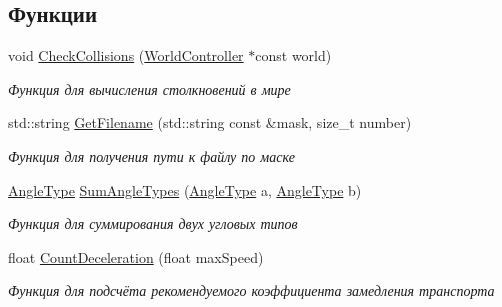 \subsection*{Функции}
\begin{DoxyCompactItemize}
\item 
void \hyperlink{namespacertm_a1fe2c356e3297343804842a57ce23a4b}{Check\+Collisions} (\hyperlink{classrtm_1_1_world_controller}{World\+Controller} $\ast$const world)
\begin{DoxyCompactList}\small\item\em Функция для вычисления столкновений в мире \end{DoxyCompactList}\item 
std\+::string \hyperlink{namespacertm_a67bf20fe33d85bc05547ff1849aeb29e}{Get\+Filename} (std\+::string const \&mask, size\+\_\+t number)
\begin{DoxyCompactList}\small\item\em Функция для получения пути к файлу по маске \end{DoxyCompactList}\item 
\hyperlink{namespacertm_a69dc82b16a0148c10962caa83d930f89}{Angle\+Type} \hyperlink{namespacertm_ac1ea2821fc44943e5c35d92e0c9cd5de}{Sum\+Angle\+Types} (\hyperlink{namespacertm_a69dc82b16a0148c10962caa83d930f89}{Angle\+Type} a, \hyperlink{namespacertm_a69dc82b16a0148c10962caa83d930f89}{Angle\+Type} b)
\begin{DoxyCompactList}\small\item\em Функция для суммирования двух угловых типов \end{DoxyCompactList}\item 
float \hyperlink{namespacertm_a37715773d85c66ba5c1bf11260836fd0}{Count\+Deceleration} (float max\+Speed)
\begin{DoxyCompactList}\small\item\em Функция для подсчёта рекомендуемого коэффициента замедления транспорта \end{DoxyCompactList}\end{DoxyCompactItemize}
